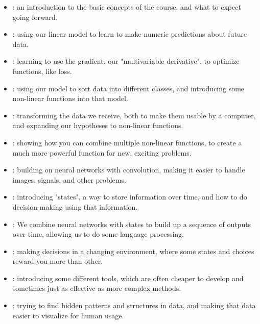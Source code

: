     \begin{itemize}
        \item {}: an introduction to the basic concepts of the course, and what to expect going forward.
        
        \item {}: using our linear model to learn to make numeric predictions about future data.
        
        \item {}: learning to use the gradient, our "multivariable derivative", to optimize functions, like loss.
        
        \item {}: using our model to sort data into different classes, and introducing some non-linear functions into that model.
        
        \item {}: transforming the data we receive, both to make them usable by a computer, and expanding our hypotheses to non-linear functions.
        
        \item {}: showing how you can combine multiple non-linear functions, to create a much more powerful function for new, exciting problems.
        
        \item {}: building on neural networks with convolution, making it easier to handle images, signals, and other problems.
        
        \item {}: introducing "states", a way to store information over time, and how to do decision-making using that information.
        
        \item {}: We combine neural networks with states to build up a sequence of outputs over time, allowing us to do some language processing.
        
        \item {}: making decisions in a changing environment, where some states and choices reward you more than other.
        
        \item {}: introducing some different tools, which are often cheaper to develop and sometimes just as effective as more complex methods.
        
        \item {}: trying to find hidden patterns and structures in data, and making that data easier to visualize for human usage.
        
        
    \end{itemize}

